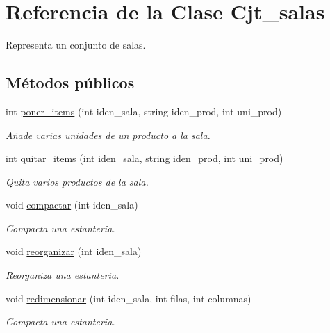 \hypertarget{class_cjt__salas}{}\section{Referencia de la Clase Cjt\+\_\+salas}
\label{class_cjt__salas}


Representa un conjunto de salas.  


\subsection*{Métodos públicos}
\begin{DoxyCompactItemize}
\item 
int \hyperlink{class_cjt__salas_ab9f5c933dbf2fa1c0bedf0ff5ae6eeb8}{poner\+\_\+items} (int iden\+\_\+sala, string iden\+\_\+prod, int uni\+\_\+prod)
\begin{DoxyCompactList}\small\item\em Añade varias unidades de un producto a la sala. \end{DoxyCompactList}\item 
int \hyperlink{class_cjt__salas_acd5d8368e51d7bbd557958063c81cc43}{quitar\+\_\+items} (int iden\+\_\+sala, string iden\+\_\+prod, int uni\+\_\+prod)
\begin{DoxyCompactList}\small\item\em Quita varios productos de la sala. \end{DoxyCompactList}\item 
void \hyperlink{class_cjt__salas_a1ecd0e8e0ae84290c354447e2a305e80}{compactar} (int iden\+\_\+sala)
\begin{DoxyCompactList}\small\item\em Compacta una estanteria. \end{DoxyCompactList}\item 
void \hyperlink{class_cjt__salas_a540d49e9ee9a7a078e18f610399335b6}{reorganizar} (int iden\+\_\+sala)
\begin{DoxyCompactList}\small\item\em Reorganiza una estanteria. \end{DoxyCompactList}\item 
void \hyperlink{class_cjt__salas_af4a9c609def322edba117ae76aa0b3b9}{redimensionar} (int iden\+\_\+sala, int filas, int columnas)
\begin{DoxyCompactList}\small\item\em Compacta una estanteria. \end{DoxyCompactList}\item 

\end{DoxyCompactItemize}
